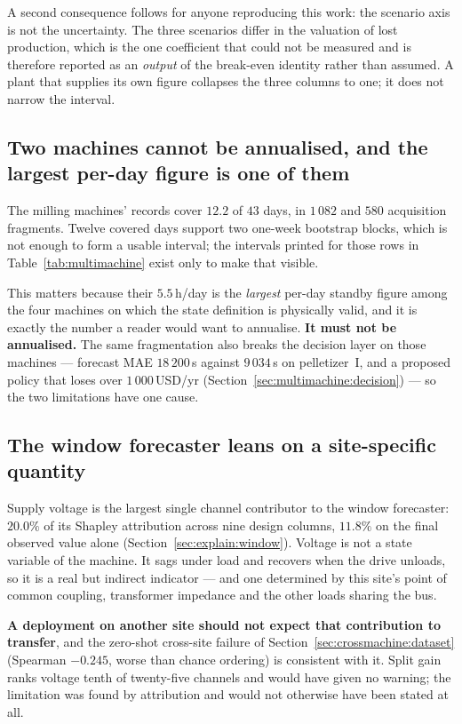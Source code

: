 A second consequence follows for anyone reproducing this work: the
scenario axis is not the uncertainty. The three scenarios differ in the
valuation of lost production, which is the one coefficient that could
not be measured and is therefore reported as an \emph{output} of the
break-even identity rather than assumed. A plant that supplies its own
figure collapses the three columns to one; it does not narrow the
interval.

\subsection{Two machines cannot be annualised, and the largest
per-day figure is one of them}
\label{sec:limitations:milling}

The milling machines' records cover $12.2$ of $43$ days, in $1\,082$ and
$580$ acquisition fragments. Twelve covered days support two one-week
bootstrap blocks, which is not enough to form a usable interval; the
intervals printed for those rows in Table~\ref{tab:multimachine} exist
only to make that visible.

This matters because their $5.5$\,h/day is the \emph{largest} per-day
standby figure among the four machines on which the state definition is
physically valid, and it is exactly the number a reader would want to
annualise. \textbf{It must not be annualised.} The same fragmentation
also breaks the decision layer on those machines --- forecast MAE
$18\,200$\,s against $9\,034$\,s on pelletizer~I, and a proposed policy
that loses over $1\,000$\,USD/yr
(Section~\ref{sec:multimachine:decision}) --- so the two limitations have
one cause.

\subsection{The window forecaster leans on a site-specific quantity}
\label{sec:limitations:voltage}

Supply voltage is the largest single channel contributor to the window
forecaster: $20.0\%$ of its Shapley attribution across nine design
columns, $11.8\%$ on the final observed value alone
(Section~\ref{sec:explain:window}). Voltage is not a state variable of
the machine. It sags under load and recovers when the drive unloads, so
it is a real but indirect indicator --- and one determined by this site's
point of common coupling, transformer impedance and the other loads
sharing the bus.

\textbf{A deployment on another site should not expect that contribution
to transfer}, and the zero-shot cross-site failure of
Section~\ref{sec:crossmachine:dataset} (Spearman $-0.245$, worse than
chance ordering) is consistent with it. Split gain ranks voltage tenth
of twenty-five channels and would have given no warning; the limitation
was found by attribution and would not otherwise have been stated at
all.

